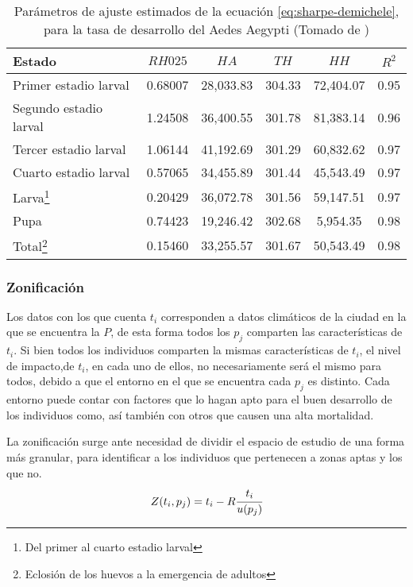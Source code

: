 \begin{table}
\begin{minipage}{\paperwidth}
\begin{tabular}{p{6cm} c c c c c }
Estado                     & $RH025$    & $HA$   & $TH$   & $HH$      & $R^2$   \\
\hline
Primer estadio larval      & 0.68007 & 28,033.83 & 304.33 & 72,404.07 & 0.95 \\
Segundo estadio larval     & 1.24508 & 36,400.55 & 301.78 & 81,383.14 & 0.96 \\
Tercer estadio larval      & 1.06144 & 41,192.69 & 301.29 & 60,832.62 & 0.97 \\
Cuarto estadio larval      & 0.57065 & 34,455.89 & 301.44 & 45,543.49 & 0.97 \\
Larva\footnote{Del primer al cuarto estadio larval} & 0.20429 & 36,072.78 & 301.56 & 59,147.51 & 0.97 \\
Pupa                       & 0.74423 & 19,246.42 & 302.68 & 5,954.35 & 0.98  \\
Total\footnote{Eclosión de los huevos a la emergencia de adultos}& 0.15460 & 33,255.57 & 301.67 & 50,543.49 & 0.98 \\

\end{tabular}
\end{minipage}
\caption{ \label{tab:tasa-desarrollo} Parámetros de ajuste estimados de la ecuación \eqref{eq:sharpe-demichele}, 
para la tasa de desarrollo del Aedes Aegypti (Tomado de \cite{rueda1990temperature})}
 
\end{table}

\subsubsection{Zonificación}
Los datos con los que cuenta $t_{i}$ corresponden a datos climáticos de la ciudad en la que se encuentra la
$P$, de esta forma todos los $p_{j}$ comparten las características de $t_{i}$. Si bien todos los individuos
comparten la mismas características de $t_{i}$, el nivel de impacto,de $t_{i}$, en cada uno de ellos, no
necesariamente será el mismo para todos, debido a que el entorno en el que se encuentra cada $p_{j}$ es 
distinto. Cada entorno puede contar con factores que lo hagan apto para el buen desarrollo de los individuos
como, así también con otros que causen una alta mortalidad.

La zonificación surge ante necesidad de dividir el espacio de estudio de una forma más granular, para identificar
a los individuos que pertenecen a zonas aptas y los que no.
\begin{equation}
Z (t_{i}, p_{j}) = t_{i} -  R \cfrac{t_{i}}{u(p_{j})}
\end{equation}

